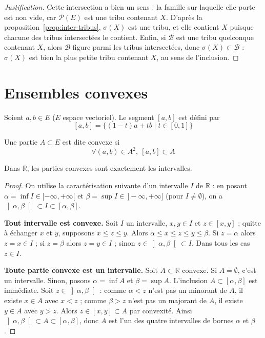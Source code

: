 \begin{proof}[Justification]
Cette intersection a bien un sens : la famille sur laquelle elle porte est non vide, car $\mathcal{P}(E)$ est une tribu contenant $X$. D'après la proposition~\ref{prop:inter-tribus}, $\sigma(X)$ est une tribu, et elle contient $X$ puisque chacune des tribus intersectées le contient. Enfin, si $\mathcal{B}$ est une tribu quelconque contenant $X$, alors $\mathcal{B}$ figure parmi les tribus intersectées, donc $\sigma(X)\subset\mathcal{B}$ : $\sigma(X)$ est bien la plus petite tribu contenant $X$, au sens de l'inclusion.
\end{proof}

\section{Ensembles convexes}

\begin{defi}[Segment]
Soient $a,b\in E$ ($E$ espace vectoriel). Le segment $[a,b]$ est défini par
\[[a,b] = \{(1-t)a+tb \mid t\in[0,1]\}\]
\end{defi}

\begin{defi}
Une partie $A\subset E$ est dite convexe si
\[\forall (a,b)\in A^2,\ [a,b]\subset A\]
\end{defi}

\begin{prop}
\label{prop:convexes-de-R}
Dans $\mathbb{R}$, les parties convexes sont exactement les intervalles.
\end{prop}

\begin{proof}
On utilise la caractérisation suivante d'un intervalle $I$ de $\mathbb{R}$ : en posant $\alpha=\inf I\in[-\infty,+\infty[$ et $\beta=\sup I\in\,]-\infty,+\infty]$ (pour $I\neq\emptyset$), on a $\left]\alpha,\beta\right[\ \subset I \subset [\alpha,\beta]$.

\textbf{Tout intervalle est convexe.} Soit $I$ un intervalle, $x,y\in I$ et $z\in[x,y]$ ; quitte à échanger $x$ et $y$, supposons $x\leq z\leq y$. Alors $\alpha\leq x\leq z\leq y\leq\beta$. Si $z=\alpha$ alors $z=x\in I$ ; si $z=\beta$ alors $z=y\in I$ ; sinon $z\in\left]\alpha,\beta\right[\subset I$. Dans tous les cas $z\in I$.

\textbf{Toute partie convexe est un intervalle.} Soit $A\subset\mathbb{R}$ convexe. Si $A=\emptyset$, c'est un intervalle. Sinon, posons $\alpha=\inf A$ et $\beta=\sup A$. L'inclusion $A\subset[\alpha,\beta]$ est immédiate. Soit $z\in\left]\alpha,\beta\right[$ : comme $\alpha<z$ n'est pas un minorant de $A$, il existe $x\in A$ avec $x<z$ ; comme $\beta>z$ n'est pas un majorant de $A$, il existe $y\in A$ avec $y>z$. Alors $z\in[x,y]\subset A$ par convexité. Ainsi $\left]\alpha,\beta\right[\subset A\subset[\alpha,\beta]$, donc $A$ est l'un des quatre intervalles de bornes $\alpha$ et $\beta$.
\end{proof}

